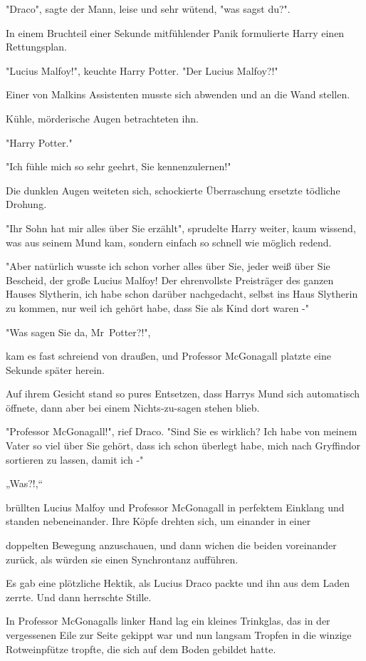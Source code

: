 {"Draco", sagte der Mann, leise und sehr wütend, "was sagst du?".

In einem Bruchteil einer Sekunde mitfühlender Panik formulierte Harry einen Rettungsplan.

"Lucius Malfoy!", keuchte Harry Potter. "Der Lucius Malfoy?!"

Einer von Malkins Assistenten musste sich abwenden und an die Wand stellen.

Kühle, mörderische Augen betrachteten ihn.

"Harry Potter."

"Ich fühle mich so sehr geehrt, Sie kennenzulernen!"

Die dunklen Augen weiteten sich, schockierte Überraschung ersetzte tödliche Drohung.

"Ihr Sohn hat mir alles über Sie erzählt", sprudelte Harry weiter, kaum wissend, was aus seinem Mund kam, sondern einfach so schnell wie möglich redend.

"Aber natürlich wusste ich schon vorher alles über Sie, jeder weiß über Sie Bescheid, der große Lucius Malfoy! Der ehrenvollste Preisträger des ganzen Hauses Slytherin, ich habe schon darüber nachgedacht, selbst ins Haus Slytherin zu kommen, nur weil ich gehört habe, dass Sie als Kind dort waren -"

"Was sagen Sie da, Mr~Potter?!",

kam es fast schreiend von draußen, und Professor McGonagall platzte eine Sekunde später herein.

Auf ihrem Gesicht stand so pures Entsetzen, dass Harrys Mund sich automatisch öffnete, dann aber bei einem Nichts-zu-sagen stehen blieb.

"Professor McGonagall!", rief Draco. "Sind Sie es wirklich? Ich habe von meinem Vater so viel über Sie gehört, dass ich schon überlegt habe, mich nach Gryffindor sortieren zu lassen, damit ich -"

„Was?!,“

brüllten Lucius Malfoy und Professor McGonagall in perfektem Einklang und standen nebeneinander. Ihre Köpfe drehten sich, um einander in einer

doppelten Bewegung anzuschauen, und dann wichen die beiden voreinander zurück, als würden sie einen Synchrontanz aufführen.

Es gab eine plötzliche Hektik, als Lucius Draco packte und ihn aus dem Laden zerrte. Und dann herrschte Stille.

In Professor McGonagalls linker Hand lag ein kleines Trinkglas, das in der vergessenen Eile zur Seite gekippt war und nun langsam Tropfen in die winzige Rotweinpfütze tropfte, die sich auf dem Boden gebildet hatte.

}
